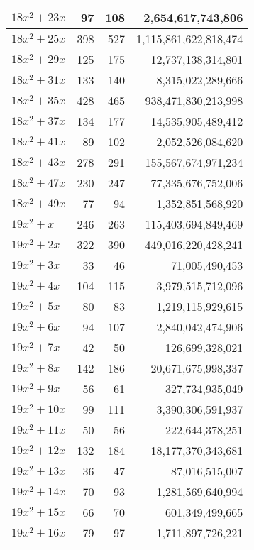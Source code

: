 \documentclass[a4paper]{amsproc}
\theoremstyle{plain}
\theoremstyle{named}
\begin{document}
\begin{longtable}{ | l | r | r | r | }
$18x^2 + 23x$ & 97 & 108 & 2{,}654{,}617{,}743{,}806 \\ \hline
$18x^2 + 25x$ & 398 & 527 & 1{,}115{,}861{,}622{,}818{,}474 \\ \hline
$18x^2 + 29x$ & 125 & 175 & 12{,}737{,}138{,}314{,}801 \\ \hline
$18x^2 + 31x$ & 133 & 140 & 8{,}315{,}022{,}289{,}666 \\ \hline
$18x^2 + 35x$ & 428 & 465 & 938{,}471{,}830{,}213{,}998 \\ \hline
$18x^2 + 37x$ & 134 & 177 & 14{,}535{,}905{,}489{,}412 \\ \hline
$18x^2 + 41x$ & 89 & 102 & 2{,}052{,}526{,}084{,}620 \\ \hline
$18x^2 + 43x$ & 278 & 291 & 155{,}567{,}674{,}971{,}234 \\ \hline
$18x^2 + 47x$ & 230 & 247 & 77{,}335{,}676{,}752{,}006 \\ \hline
$18x^2 + 49x$ & 77 & 94 & 1{,}352{,}851{,}568{,}920 \\ \hline
$19x^2 + x$ & 246 & 263 & 115{,}403{,}694{,}849{,}469 \\ \hline
$19x^2 + 2x$ & 322 & 390 & 449{,}016{,}220{,}428{,}241 \\ \hline
$19x^2 + 3x$ & 33 & 46 & 71{,}005{,}490{,}453 \\ \hline
$19x^2 + 4x$ & 104 & 115 & 3{,}979{,}515{,}712{,}096 \\ \hline
$19x^2 + 5x$ & 80 & 83 & 1{,}219{,}115{,}929{,}615 \\ \hline
$19x^2 + 6x$ & 94 & 107 & 2{,}840{,}042{,}474{,}906 \\ \hline
$19x^2 + 7x$ & 42 & 50 & 126{,}699{,}328{,}021 \\ \hline
$19x^2 + 8x$ & 142 & 186 & 20{,}671{,}675{,}998{,}337 \\ \hline
$19x^2 + 9x$ & 56 & 61 & 327{,}734{,}935{,}049 \\ \hline
$19x^2 + 10x$ & 99 & 111 & 3{,}390{,}306{,}591{,}937 \\ \hline
$19x^2 + 11x$ & 50 & 56 & 222{,}644{,}378{,}251 \\ \hline
$19x^2 + 12x$ & 132 & 184 & 18{,}177{,}370{,}343{,}681 \\ \hline
$19x^2 + 13x$ & 36 & 47 & 87{,}016{,}515{,}007 \\ \hline
$19x^2 + 14x$ & 70 & 93 & 1{,}281{,}569{,}640{,}994 \\ \hline
$19x^2 + 15x$ & 66 & 70 & 601{,}349{,}499{,}665 \\ \hline
$19x^2 + 16x$ & 79 & 97 & 1{,}711{,}897{,}726{,}221 \\ \hline

\end{longtable}
\end{document}
